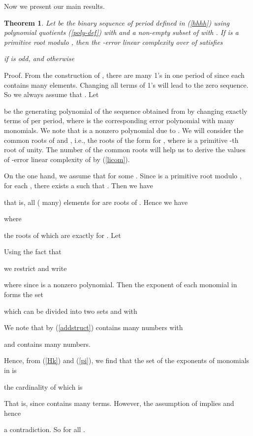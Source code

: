 \documentclass [11pt,a4paper]{article}
\newtheorem{theorem}{Theorem}
\begin{document}
Now we present our main results.


\begin{theorem}\label{klc-2-primitive}
Let  be the binary sequence of period  defined in (\ref{hhhh}) using polynomial quotients (\ref{poly-def}) with  and a non-empty subset  of  with . If  is a primitive root modulo , then
the -error linear complexity  over  of   satisfies

if  is odd, and otherwise

\end{theorem}
Proof. From the construction of , there are  many 1's in one period of  since each  contains  many elements. Changing
all terms of 1's will lead to the zero sequence. So we always assume that . Let

be the generating polynomial of the sequence obtained from  by changing exactly  terms of  per period,
where  is the corresponding error polynomial with  many  monomials. We note that  is a nonzero polynomial due to . We will consider the common roots of  and ,
i.e.,  the roots of the form  for , where  is a  primitive -th root of unity. The number of the common roots will help us to derive the values of -error linear
complexity of   by  (\ref{licom}).

On the one hand, we assume that  for some . Since  is a primitive root modulo , for each , there exists a  such that . Then we have

that is, all ( many) elements  for  are roots of . Hence we have

where

the roots of which are exactly  for .  Let

Using the fact that

we restrict  and write

where  since  is a nonzero polynomial. Then the exponent of each monomial in  forms the set

which can be divided into two sets  and  with


We note that by (\ref{addstruct})  contains  many numbers with

and  contains  many numbers.

Hence, from (\ref{Hk}) and (\ref{pi}), we find that
the set of the exponents of monomials in  is

the cardinality of which is

That is,  since  contains  many terms. However, the
assumption of 
implies  and hence

a contradiction.
So  for all .
\end{document}
